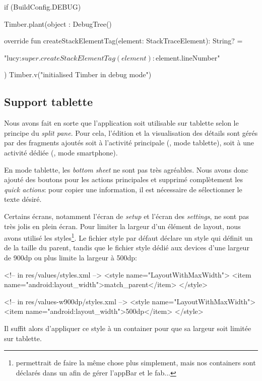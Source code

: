 \begin{kotlincode}
if (BuildConfig.DEBUG) {
    Timber.plant(object : DebugTree() {
        override fun createStackElementTag(element: StackTraceElement): String? =

        "lucy:${super.createStackElementTag(element)}:${element.lineNumber}"
    })
    Timber.v("initialised Timber in debug mode")
}
\end{kotlincode}    

\subsection{Support tablette}

Nous avons fait en sorte que l'application soit utilisable sur tablette selon le principe du \emph{split pane}. Pour cela, l'édition et la visualisation des détails sont gérés par des fragments ajoutés soit à l'activité principale (, mode tablette), soit à une activité dédiée (, mode smartphone). 

En mode tablette, les \emph{bottom sheet} ne sont pas très agréables. Nous avons donc ajouté des boutons pour les actions principales et supprimé complètement les \emph{quick actions}: pour copier une information, il est nécessaire de sélectionner le texte désiré. 

Certains écrans, notamment l'écran de \emph{setup} et l'écran des \emph{settings}, ne sont pas très jolis en plein écran. Pour limiter la largeur d'un élément de layout, nous avons utilisé les styles\footnote{ permettrait de faire la même chose plus simplement, mais nos containers sont déclarés dans un  afin de gérer l'appBar et le fab...}. Le fichier style par défaut déclare un style  qui définit un  de la taille du parent, tandis que le fichier style dédié aux devices d'une largeur de 900dp ou plus limite la largeur à 500dp:

\begin{xmlcode}
<!-- in res/values/styles.xml -->
<style name="LayoutWithMaxWidth">
    <item name="android:layout_width">match_parent</item>
</style>

<!-- in res/values-w900dp/styles.xml -->
<style name="LayoutWithMaxWidth">
    <item name="android:layout_width">500dp</item>
</style>
\end{xmlcode}

Il suffit alors d'appliquer ce style à un container pour que sa largeur soit limitée sur tablette.

